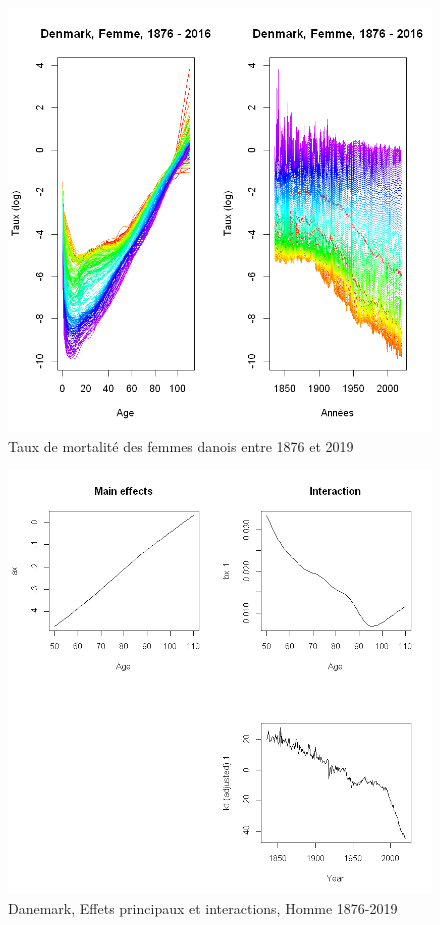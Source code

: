\begin{figure}[!htb]
 \caption{Taux de mortalité des femmes danois entre 1876 et 2019}
    \centering
    \includegraphics[scale =0.65]{output_7_1.png}
\end{figure}

\begin{figure}[!htb]
 \caption{Danemark, Effets principaux et interactions, Homme 1876-2019}
    \centering
    \includegraphics[scale =0.65]{output_7_3.png}
\end{figure}

